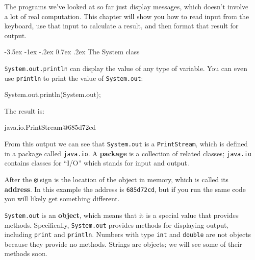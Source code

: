 \documentclass[12pt]{book}
\makeatletter
\renewcommand{\section}{\@startsection {section}{1}{\z@}%
    {-3.5ex \@plus -1ex \@minus -.2ex}%
    {0.7ex \@plus.2ex}%
    {\normalfont\Large\bfseries}}
\theoremstyle{exercise}
\newcommand{\java}[1]{\lstinline{#1}} %
\makeatother
\begin{document}


The programs we've looked at so far just display messages, which doesn't involve a lot of real computation.
This chapter will show you how to read input from the keyboard, use that input to calculate a result, and then format that result for output.


\section{The System class}
\label{sec:system}


\java{System.out.println} can display the value of any type of variable.
You can even use \java{println} to print the value of \java{System.out}:

\begin{code}
    System.out.println(System.out);
\end{code}

The result is:

\begin{stdout}
java.io.PrintStream@685d72cd
\end{stdout}


From this output we can see that \java{System.out} is a \java{PrintStream}, which is defined in a package called \java{java.io}.
A {\bf package} is a collection of related classes; \java{java.io} contains classes for ``I/O'' which stands for input and output.


After the {\tt @} sign is the location of the object in memory, which is called its {\bf address}.
In this example the address is \java{685d72cd}, but if you run the same code you will likely get something different.


\java{System.out} is an {\bf object}, which means that it is a special value that provides methods.
Specifically, \java{System.out} provides methods for displaying output, including \java{print} and \java{println}.
Numbers with type \java{int} and \java{double} are not objects because they provide no methods.
Strings are objects; we will see some of their methods soon.
\end{document}
